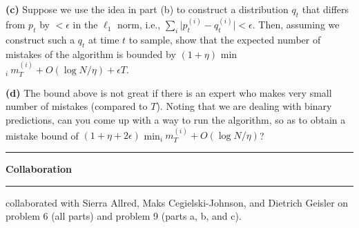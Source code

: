 \documentclass[11pt]{article}
\newcommand\question[2]{\vspace{.25in}\hrule\textbf{#1}\vspace{.5em}\hrule\vspace{.10in}}
\renewcommand\part[1]{\vspace{.10in}\textbf{(#1)}}
\begin{document}

\part{c}  Suppose we use the idea in part (b) to construct a distribution $q_t$ that differs from $p_t$ by $< \epsilon$ in the $\ell_1$ norm, i.e., 
$\sum_i \vert p_t^{(i)} - q_t^{(i)} \vert < \epsilon$. Then, assuming we construct such a $q_t$ at time $t$ to sample, show that the expected number of mistakes of the algorithm is bounded by $(1 + \eta)$ min$_i \ m_T^{(i)} + O(\log N/\eta) + \epsilon T$.


\part{d} The bound above is not great if there is an expert who makes very small number of mistakes (compared to $T$). Noting that we are dealing with binary predictions, can you come up with a way to run the algorithm, so as to obtain a mistake bound of $(1 + \eta + 2 \epsilon)$ min$_i \ m_T^{(i)} + O(\log N/\eta)$?


\newpage

\question{Collaboration}

I collaborated with Sierra Allred, Maks Cegielski-Johnson, and Dietrich Geisler on problem 6 (all parts) and problem 9 (parts a, b, and c).
\end{document}
